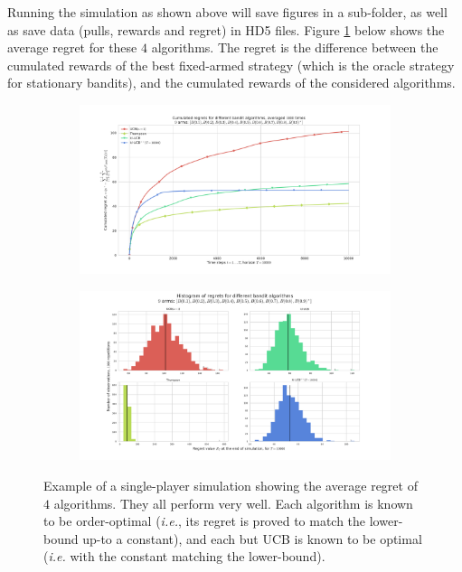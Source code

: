 \documentclass[a4paper,10pt,]{article}
\begin{document}
Running the simulation as shown above will save figures in a sub-folder,
as well as save data (pulls, rewards and regret) in HD5 files. Figure
\ref{fig:plot1} below shows the average regret for these \(4\)
algorithms. The regret is the difference between the cumulated rewards
of the best fixed-armed strategy (which is the oracle strategy for
stationary bandits), and the cumulated rewards of the considered
algorithms.

\begin{figure}
\centering
\begin{subfigure}[b]{0.49\textwidth}
  \includegraphics[width=\textwidth]{plots/paper/3.pdf}
\end{subfigure}
\begin{subfigure}[b]{0.49\textwidth}
  \includegraphics[width=\textwidth]{plots/paper/3_hist.pdf}
\end{subfigure}
\caption{Example of a single-player simulation showing the average regret of
\(4\) algorithms. They all perform very well. Each algorithm is known to
be order-optimal (\emph{i.e.}, its regret is proved to match the
lower-bound up-to a constant), and each but UCB is known to be optimal
(\emph{i.e.} with the constant matching the
lower-bound).\label{fig:plot1}}
\end{figure}
\end{document}

